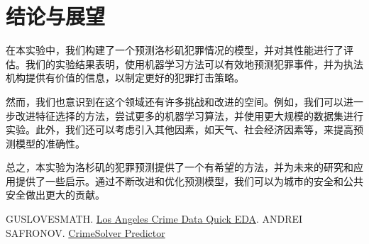 \documentclass{article}
\begin{document}
\section{结论与展望}
在本实验中，我们构建了一个预测洛杉矶犯罪情况的模型，并对其性能进行了评估。我们的实验结果表明，使用机器学习方法可以有效地预测犯罪事件，并为执法机构提供有价值的信息，以制定更好的犯罪打击策略。

然而，我们也意识到在这个领域还有许多挑战和改进的空间。例如，我们可以进一步改进特征选择的方法，尝试更多的机器学习算法，并使用更大规模的数据集进行实验。此外，我们还可以考虑引入其他因素，如天气、社会经济因素等，来提高预测模型的准确性。

总之，本实验为洛杉矶的犯罪预测提供了一个有希望的方法，并为未来的研究和应用提供了一些启示。通过不断改进和优化预测模型，我们可以为城市的安全和公共安全做出更大的贡献。

\begin{thebibliography}{99}
     GUSLOVESMATH. \href{https://www.kaggle.com/code/guslovesmath/los-angeles-crime-data-quick-eda}{Los Angeles Crime Data Quick EDA}.
     ANDREI SAFRONOV. \href{https://www.kaggle.com/code/safronov00/crimesolver-predictor#2.-Clean-Data}{CrimeSolver Predictor}
\end{thebibliography}
\end{document}
